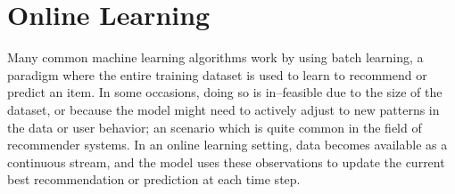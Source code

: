 \section{Online Learning} \label{sect:theory:online-learning}

Many common machine learning algorithms work by using batch learning, a paradigm where the entire training dataset is used to learn to recommend or predict an item. In some occasions, doing so is in--feasible due to the size of the dataset, or because the model might need to actively adjust to new patterns in the data or user behavior; an scenario which is quite common in the field of recommender systems. In an online learning setting, data becomes available as a continuous stream, and the model uses these observations to update the current best recommendation or prediction at each time step.
